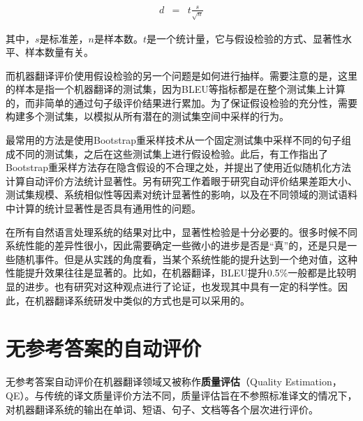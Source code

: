 \begin{eqnarray}
d&=&t \frac{s}{\sqrt{n}}
\label{eq:4-21}
\end{eqnarray}

\noindent 其中，$s$是标准差，$n$是样本数。$t$是一个统计量，它与假设检验的方式、显著性水平、样本数量有关。

\parinterval 而机器翻译评价使用假设检验的另一个问题是如何进行抽样。需要注意的是，这里的样本是指一个机器翻译的测试集，因为BLEU等指标都是在整个测试集上计算的，而非简单的通过句子级评价结果进行累加。为了保证假设检验的充分性，需要构建多个测试集，以模拟从所有潜在的测试集空间中采样的行为。

\parinterval 最常用的方法是使用Bootstrap重采样技术从一个固定测试集中采样不同的句子组成不同的测试集，之后在这些测试集上进行假设检验。此后，有工作指出了Bootstrap重采样方法存在隐含假设的不合理之处，并提出了使用近似随机化方法计算自动评价方法统计显著性。另有研究工作着眼于研究自动评价结果差距大小、测试集规模、系统相似性等因素对统计显著性的影响，以及在不同领域的测试语料中计算的统计显著性是否具有通用性的问题。

\parinterval 在所有自然语言处理系统的结果对比中，显著性检验是十分必要的。很多时候不同系统性能的差异性很小，因此需要确定一些微小的进步是否是“真”的，还是只是一些随机事件。但是从实践的角度看，当某个系统性能的提升达到一个绝对值，这种性能提升效果往往是显著的。比如，在机器翻译，BLEU提升0.5$\%$一般都是比较明显的进步。也有研究对这种观点进行了论证，也发现其中具有一定的科学性。因此，在机器翻译系统研发中类似的方式也是可以采用的。


\sectionnewpage
\section{无参考答案的自动评价}

\parinterval 无参考答案自动评价在机器翻译领域又被称作{\small\sffamily\bfseries{质量评估}}（Quality Estimation，\\QE）。与传统的译文质量评价方法不同，质量评估旨在不参照标准译文的情况下，对机器翻译系统的输出在单词、短语、句子、文档等各个层次进行评价。

